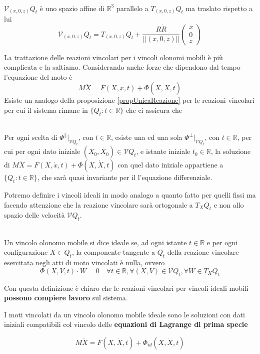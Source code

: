 \documentclass[11pt,a4paper,twoside]{book}
\newenvironment{proposizione}[1][\empty]{\begin{Proposizione}{
\ifx\empty#1\relax\else\mdseries\itshape#1\\\fi
}{}}{\end{Proposizione}}
\newenvironment{definizione}[1][\empty]{\begin{Definizione}{
\ifx\empty#1\relax\else\mdseries\itshape#1\\\fi
}{}}{\end{Definizione}}
\newenvironment{importante}[0]{ 
  \begin{center}\begin{tcolorbox}[enhanced,
  before skip=2mm,after skip=3mm,
  boxrule=0.4pt,left=5mm,right=2mm,top=1mm,bottom=1mm,
  colback=yellow!50,
  colframe=yellow!20!black,
  sharp corners,arc=3mm,
  underlay={
  	\path[fill=red!50!black,draw=none] (interior.south west) rectangle 			node[white]{\Huge\bfseries !} ([xshift=4mm]interior.north west);
  },
  drop fuzzy shadow]
  }{
 \normalsize \end{tcolorbox}\end{center}
}
\newenvironment{esempio}[1][Esempio]{ 
  \begin{center}\begin{tcolorbox}[
  title={#1:\\},
  width=0.9\linewidth,
  flush right,
  enhanced jigsaw, 
  colback=white, 
  frame hidden, 
  sharpish corners, arc=3mm,
  borderline west = {1pt}{0pt}{gray},
  borderline south = {1pt}{0pt}{gray},
  coltitle=black, 
  fonttitle=\small\bfseries, 
  attach title to upper, 
  breakable,
  top=2.5pt, bottom=0.3pt]\small
  }{
 \normalsize \end{tcolorbox}\end{center}
}
\theoremstyle{esss}
\theoremstyle{dotless}
\numberwithin{equation}{section} %
\begin{document}
\begin{esempio}[Pendolo di lunghezza variabile]
\begin{align*}
\end{align*}
$\mathcal{V}_{(x,0,z)}Q_t$ è uno spazio affine di $\mathbb{R}^3$ parallelo a $T_{(x,0,z)}Q_t$ ma traslato rispetto a lui 
\[\mathcal{V}_{(x,0,z)}Q_t=T_{(x,0,z)}Q_t + \dfrac{R\dot{R}}{\left|\left| (x,0,z) \right| \right|}\left(\begin{array}{c}x \\ 0 \\ z \end{array}\right)\]
\end{esempio}

La trattazione delle reazioni vincolari per i vincoli olonomi mobili è più complicata e la saltiamo.
Considerando anche forze che dipendono dal tempo l'equazione del moto è
\[
M\ddot{X}=F(X,\dot{x},t)+\Phi(X,\dot{X},t)
\]
Esiste un analogo della proposizione \ref{propUnicaReazione} per le reazioni vincolari per cui il sistema rimane in $\{Q_t:t\in\mathbb{R}\}$ che ci assicura che
\begin{proposizione}
Per ogni scelta di $\Phi^\parallel|_{\mathcal{V}Q_t}$, con $t\in\mathbb{R}$, esiste una ed una sola $\Phi^\perp|_{\mathcal{V}Q_t}$, con $t\in\mathbb{R}$, per cui per ogni dato iniziale $(X_0,\dot{X_0})\in\mathcal{V}Q_t$, e istante iniziale $t_0\in\mathbb{R}$, la soluzione di $M\ddot{X}=F(X,\dot{x},t)+\Phi(X,\dot{X},t)$ con quel dato iniziale appartiene a $\{Q_t:t\in\mathbb{R}\}$, che sarà quasi invariante per il l'equazione differenziale.
\end{proposizione}

Potremo definire i vincoli ideali in modo analogo a quanto fatto per quelli fissi ma facendo attenzione che la reazione vincolare sarà ortogonale a $T_XQ_t$  e non allo spazio delle velocità $\mathcal{V}Q_t$.

\begin{definizione}
Un vincolo olonomo mobile si dice ideale se, ad ogni istante $t\in\mathbb{R}$ e per ogni configurazione $X\in Q_t$, la componente tangente a $Q_t$ della reazione vincolare esercitata negli atti di moto vincolati è nulla, ovvero
\[
\Phi(X,V,t)\cdot W = 0 \quad \forall t\in\mathbb{R}, \forall (X,V)\in\mathcal{V}Q_t, \forall W\in T_XQ_t
\]
\end{definizione}

Con questa definizione è chiaro che le reazioni vincolari per vincoli ideali mobili \textbf{possono compiere lavoro} sul sistema.

\begin{importante}
I moti vincolati da un vincolo olonomo mobile ideale sono le soluzioni con dati iniziali compatibili col vincolo delle \textbf{equazioni di Lagrange di prima specie}

\begin{equation} \label{eqLagrangePrimaSpecieMobile}
M\ddot{X}=F(X,\dot{X},t)+\Phi_{id}(X,\dot{X},t)
\end{equation}

\end{importante}
\end{document}
